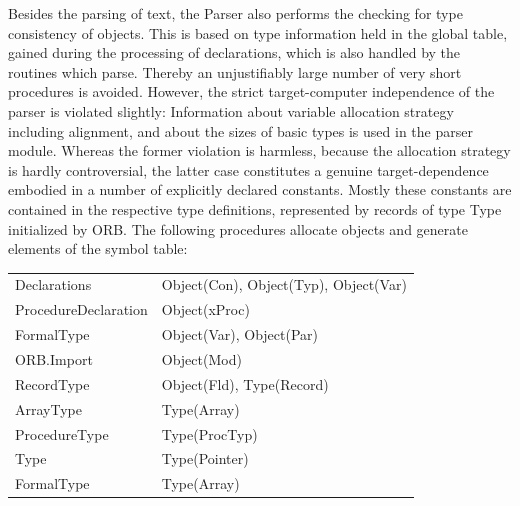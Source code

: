Besides the parsing of text, the Parser also performs the checking for type consistency of objects.
This is based on type information held in the global table, gained during the processing of
declarations, which is also handled by the routines which parse. Thereby an unjustifiably large
number of very short procedures is avoided. However, the strict target-computer independence of
the parser is violated slightly: Information about variable allocation strategy including alignment, and
about the sizes of basic types is used in the parser module. Whereas the former violation is
harmless, because the allocation strategy is hardly controversial, the latter case constitutes a
genuine target-dependence embodied in a number of explicitly declared constants. Mostly these
constants are contained in the respective type definitions, represented by records of type Type
initialized by ORB. The following procedures allocate objects and generate elements of the symbol
table:
\begin{table}[h!]
  \centering
  \begin{tabular}{l l}
    Declarations         & Object(Con), Object(Typ), Object(Var) \\
    ProcedureDeclaration & Object(xProc) \\
    FormalType           & Object(Var), Object(Par) \\
    ORB.Import           & Object(Mod) \\
    RecordType           & Object(Fld), Type(Record) \\
    ArrayType            & Type(Array) \\
    ProcedureType        & Type(ProcTyp) \\
    Type                 & Type(Pointer) \\
    FormalType           & Type(Array)
  \end{tabular}
\end{table}

